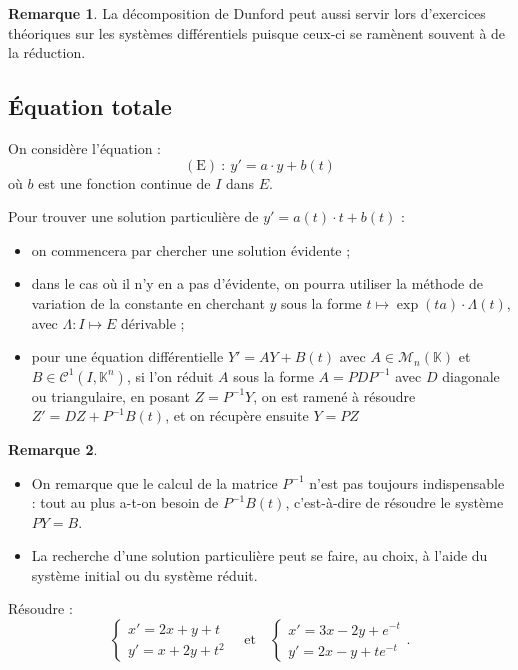 \documentclass[french]{article}
\newcommand{\K}{\mathbb{K}}
\newcommand{\inv}{^{-1}}
\theoremstyle{plain}
\theoremstyle{definition}
\newtheorem*{rmq}{Remarque}
\theoremstyle{remark}
\begin{document}
\begin{rmq}
	La décomposition de Dunford peut aussi servir lors d'exercices théoriques sur les systèmes différentiels puisque ceux-ci se ramènent souvent à de la réduction.
\end{rmq}

\subsection{Équation totale}

On considère l'équation :
$$(\text{E})\ :\ y'=a\cdot y+b(t)$$
où $b$ est une fonction continue de $I$ dans $E$.

\begin{met}
	Pour trouver une solution particulière de $y'=a(t)\cdot t+b(t)$ :
	\begin{itemize}
		\item on commencera par chercher une solution évidente ;
		\item dans le cas où il n'y en a pas d'évidente, on pourra utiliser la méthode de variation de la constante en cherchant $y$ sous la forme $t\mapsto\exp(ta)\cdot\Lambda(t)$, avec $\Lambda:I\mapsto E$ dérivable ;
		\item pour une équation différentielle $Y'=AY+B(t)$ avec $A\in\mathcal{M}_n(\K)$ et $B\in\mathcal{C}^1(I,\K^n)$, si l'on réduit $A$ sous la forme $A=PDP\inv$ avec $D$ diagonale ou triangulaire, en posant $Z=P\inv Y$, on est ramené à résoudre $Z'=DZ+P\inv B(t)$, et on récupère ensuite $Y=PZ$
	\end{itemize}
\end{met}

\begin{rmq}
	\begin{itemize}
		\item On remarque que le calcul de la matrice $P\inv$ n'est pas toujours indispensable : tout au plus a-t-on besoin de $P\inv B(t)$, c'est-à-dire de résoudre le système $PY=B$.
		\item La recherche d'une solution particulière peut se faire, au choix, à l'aide du système initial ou du système réduit.
	\end{itemize}
\end{rmq}

\begin{exo}
	Résoudre :
	$$\begin{cases}
		x'=2x+y+t\\
		y'=x+2y+t^2
	\end{cases}\quad\text{et}\quad\begin{cases}
	x'=3x-2y+e^{-t}\\
	y'=2x-y+te^{-t}
	\end{cases}.$$
\end{exo}
\end{document}

